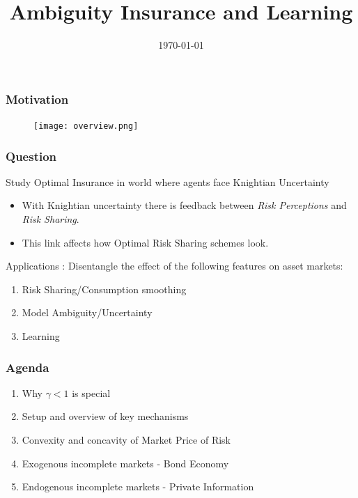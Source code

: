 \documentclass{beamer}
\title{Ambiguity Insurance and Learning}
\date{\today}
\begin{document}
%
\begin{frame}
\titlepage
\end{frame}


\begin{frame}
\frametitle{Motivation}
\begin{figure}
  \begin{center}
   
   \texttt{[image: overview.png]}
  \end{center} 
		
	\end{figure}

\end{frame}


\begin{frame}
\frametitle{Question}
Study Optimal Insurance in world where agents face Knightian Uncertainty

\begin{itemize}
	\item With Knightian uncertainty there is feedback between \emph{Risk Perceptions} and \emph{Risk Sharing}.
	\item This link affects how Optimal Risk Sharing schemes look.
\end{itemize}

Applications : Disentangle the effect of the following features on asset markets:

\begin{enumerate}
	\item Risk Sharing/Consumption smoothing
	\item Model Ambiguity/Uncertainty
	\item Learning
\end{enumerate}
\end{frame}



\begin{frame}
\frametitle{Agenda}
\begin{enumerate}

	\item Why $\gamma < 1$ is special
	\item Setup and overview of key mechanisms
	\item Convexity and concavity of Market Price of Risk
	\item Exogenous incomplete markets - Bond Economy
	\item Endogenous incomplete markets - Private Information	
\end{enumerate}
\end{frame}
\end{document}
